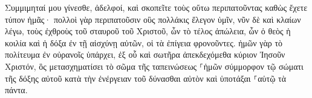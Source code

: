 \documentclass{openreader}
\begin{document}
Συμμιμηταί μου γίνεσθε, ἀδελφοί, καὶ σκοπεῖτε τοὺς οὕτω περιπατοῦντας καθὼς ἔχετε τύπον ἡμᾶς· 
πολλοὶ γὰρ περιπατοῦσιν οὓς πολλάκις ἔλεγον ὑμῖν, νῦν δὲ καὶ κλαίων λέγω, τοὺς ἐχθροὺς τοῦ σταυροῦ τοῦ Χριστοῦ, 
ὧν τὸ τέλος ἀπώλεια, ὧν ὁ θεὸς ἡ κοιλία καὶ ἡ δόξα ἐν τῇ αἰσχύνῃ αὐτῶν, οἱ τὰ ἐπίγεια φρονοῦντες. 
ἡμῶν γὰρ τὸ πολίτευμα ἐν οὐρανοῖς ὑπάρχει, ἐξ οὗ καὶ σωτῆρα ἀπεκδεχόμεθα κύριον Ἰησοῦν Χριστόν, 
ὃς μετασχηματίσει τὸ σῶμα τῆς ταπεινώσεως ⸀ἡμῶν σύμμορφον τῷ σώματι τῆς δόξης αὐτοῦ κατὰ τὴν ἐνέργειαν τοῦ δύνασθαι αὐτὸν καὶ ὑποτάξαι ⸀αὑτῷ τὰ πάντα. 
\end{document}
